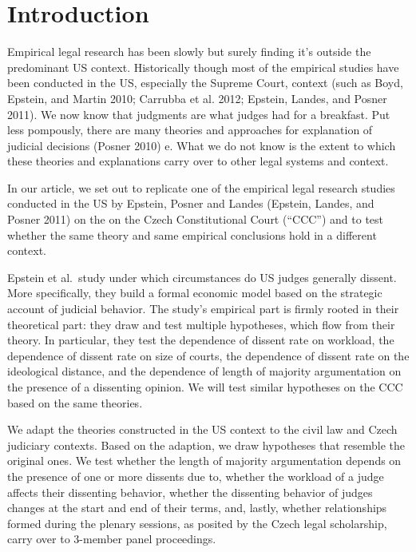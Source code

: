 \documentclass[
  11pt,
]{article}
\begin{document}
\vskip -8.5pt




\setlength{\parindent}{16pt}
\setlength{\parskip}{0pt}

\doublespacing
\vspace{30pt}

\hypertarget{introduction}{%
\section{Introduction}\label{introduction}}

Empirical legal research has been slowly but surely finding it's outside
the predominant US context. Historically though most of the empirical
studies have been conducted in the US, especially the Supreme Court,
context (such as Boyd, Epstein, and Martin 2010; Carrubba et al. 2012;
Epstein, Landes, and Posner 2011). We now know that judgments are what
judges had for a breakfast. Put less pompously, there are many theories
and approaches for explanation of judicial decisions (Posner 2010) e.
What we do not know is the extent to which these theories and
explanations carry over to other legal systems and context.

In our article, we set out to replicate one of the empirical legal
research studies conducted in the US by Epstein, Posner and Landes
(Epstein, Landes, and Posner 2011) on the on the Czech Constitutional
Court (``CCC'') and to test whether the same theory and same empirical
conclusions hold in a different context.

Epstein et al.~study under which circumstances do US judges generally
dissent. More specifically, they build a formal economic model based on
the strategic account of judicial behavior. The study's empirical part
is firmly rooted in their theoretical part: they draw and test multiple
hypotheses, which flow from their theory. In particular, they test the
dependence of dissent rate on workload, the dependence of dissent rate
on size of courts, the dependence of dissent rate on the ideological
distance, and the dependence of length of majority argumentation on the
presence of a dissenting opinion. We will test similar hypotheses on the
CCC based on the same theories.

We adapt the theories constructed in the US context to the civil law and
Czech judiciary contexts. Based on the adaption, we draw hypotheses that
resemble the original ones. We test whether the length of majority
argumentation depends on the presence of one or more dissents due to,
whether the workload of a judge affects their dissenting behavior,
whether the dissenting behavior of judges changes at the start and end
of their terms, and, lastly, whether relationships formed during the
plenary sessions, as posited by the Czech legal scholarship, carry over
to 3-member panel proceedings.
\end{document}
